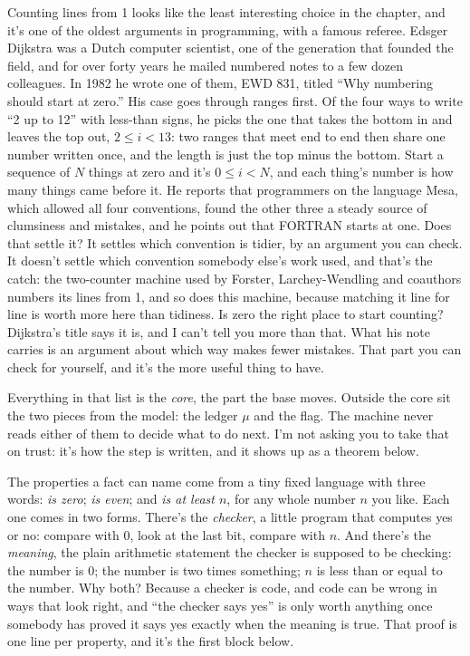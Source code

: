 \documentclass[11pt,twoside]{article}
\theoremstyle{thielethm}
\theoremstyle{thieledef}
\theoremstyle{thieledef}
\theoremstyle{thieledef}
\theoremstyle{thielethm}
\theoremstyle{thieleobs}
\theoremstyle{thielethm}
\begin{document}
Counting lines from 1 looks like the least interesting choice in the chapter, and it's one of
the oldest arguments in programming, with a famous referee. Edsger Dijkstra was a Dutch computer
scientist, one of the generation that founded the field, and for over forty years he mailed
numbered notes to a few dozen colleagues. In 1982 he wrote one of them, EWD 831, titled ``Why
numbering should start at
zero.'' His case goes through ranges first. Of the four ways to write ``2 up to 12'' with
less-than signs, he picks the one that takes the bottom in and leaves the top out,
$2 \le i < 13$: two ranges that meet end to end then share one number written once, and the
length is just the top minus the bottom. Start a sequence of $N$ things at zero and it's
$0 \le i < N$, and each thing's number is how many things came before it. He reports that
programmers on the language Mesa, which allowed all four conventions, found the other three a
steady source of clumsiness and mistakes, and he points out that FORTRAN starts at one. Does that
settle it? It settles which convention is tidier, by an argument you can check. It doesn't settle
which convention somebody else's work used, and that's the catch: the two-counter
machine used by Forster, Larchey-Wendling and coauthors numbers its lines from 1, and so does this machine,
because matching it line for line is worth more here than tidiness. Is zero the right place to
start counting? Dijkstra's title says it is, and I can't tell you more than that. What his note
carries is an argument about which way makes fewer mistakes. That part you can check for
yourself, and it's the more useful thing to have.

Everything in that list is the \emph{core}, the part the base moves. Outside the core sit the two
pieces from the model: the ledger $\mu$ and the flag. The machine never reads either of
them to decide what to do next. I'm not asking you to take that on trust: it's how the step is
written, and it shows up as a theorem below.

The properties a fact can name come from a tiny fixed language with three words: \emph{is zero};
\emph{is even}; and \emph{is at least $n$}, for any whole number $n$ you like. Each one comes in two
forms. There's the \emph{checker}, a little program that computes yes or no: compare with 0,
look at the last bit, compare with $n$. And there's the \emph{meaning}, the plain arithmetic
statement the checker is supposed to be checking: the number is 0; the number is two times
something; $n$ is less than or equal to the number. Why both? Because a checker is code, and
code can be wrong in ways that look right, and ``the checker says yes'' is only worth
anything once somebody has proved it says yes exactly when the meaning is true. That proof
is one line per property, and it's the first block below.
\end{document}
